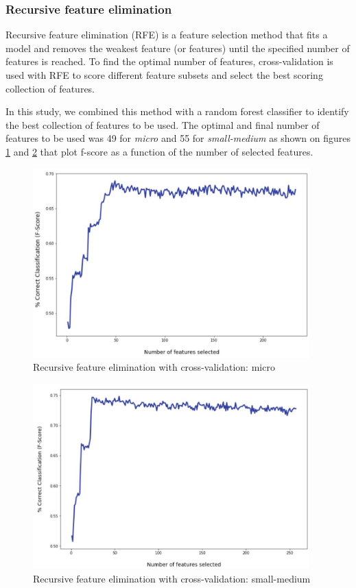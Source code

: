 \documentclass[LaM,binding=0.6cm, english]{sapthesis}
\begin{document}
\subsubsection{Recursive feature elimination}

Recursive feature elimination (RFE) is a feature selection method that fits a model and removes the weakest feature (or features) until the specified number of features is reached. To find the optimal number of features, cross-validation is used with RFE to score different feature subsets and select the best scoring collection of features.\cite{scikitRFE}

In this study, we combined this method with a random forest classifier to identify the best collection of features to be used. The optimal and final number of features to be used was 49 for \textit{micro} and 55 for \textit{small-medium} as shown on figures \ref{fig:rfecv_micro} and \ref{fig:rfecv_small-medium} that plot f-score as a function of the number of selected features.

\begin{figure}[!ht]
  \includegraphics[width=0.95\textwidth]{images/rfecv_micro.jpg}
  \centering
  \caption{Recursive feature elimination with cross-validation: micro}	
  \label{fig:rfecv_micro}
\end{figure}

\begin{figure}[!ht]
  \includegraphics[width=0.95\textwidth]{images/rfecv_small-medium.jpg}
  \centering
  \caption{Recursive feature elimination with cross-validation: small-medium}
  \label{fig:rfecv_small-medium}
\end{figure}
\end{document}
